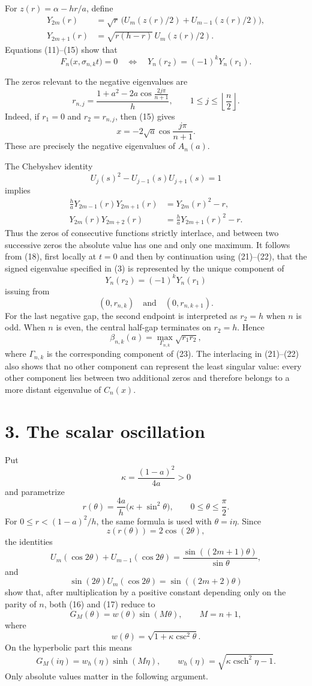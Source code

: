 \documentclass[11pt]{article}
\begin{document}
For \(z(r)=\alpha-hr/a\), define
\begin{align}
Y_{2m}(r)
 &=\sqrt r\,
   \bigl(U_m(z(r)/2)+U_{m-1}(z(r)/2)\bigr),
\tag{16}\\
Y_{2m+1}(r)
 &=\sqrt{r(h-r)}\,U_m(z(r)/2).
\tag{17}
\end{align}
Equations (11)--(15) show that
\[
F_n\bigl(x,\sigma_{n,k}t\bigr)=0
\quad\Longleftrightarrow\quad
Y_n(r_2)=(-1)^kY_n(r_1).
\tag{18}
\]

The zeros relevant to the negative eigenvalues are
\[
r_{n,j}
 =\frac{1+a^2-2a\cos\frac{2j\pi}{n+1}}h,
\qquad
1\leq j\leq \left\lfloor\frac n2\right\rfloor.
\tag{19}
\]
Indeed, if \(r_1=0\) and \(r_2=r_{n,j}\), then (15) gives
\[
x=-2\sqrt a\cos\frac{j\pi}{n+1}.
\]
These are precisely the negative eigenvalues of \(A_n(a)\).

The Chebyshev identity
\[
U_j(s)^2-U_{j-1}(s)U_{j+1}(s)=1
\tag{20}
\]
implies
\begin{align}
\frac haY_{2m-1}(r)Y_{2m+1}(r)&=Y_{2m}(r)^2-r,
\tag{21}\\
Y_{2m}(r)Y_{2m+2}(r)&=\frac haY_{2m+1}(r)^2-r.
\tag{22}
\end{align}
Thus the zeros of consecutive functions strictly interlace, and between two
successive zeros the absolute value has one and only one maximum. It follows
from (18), first locally at \(t=0\) and then by continuation using
(21)--(22), that the signed eigenvalue specified in (3) is represented by the
unique component of
\[
Y_n(r_2)=(-1)^kY_n(r_1)
\tag{23}
\]
issuing from
\[
(0,r_{n,k})
\quad\text{and}\quad
(0,r_{n,k+1}).
\]
For the last negative gap, the second endpoint is interpreted as \(r_2=h\)
when \(n\) is odd. When \(n\) is even, the central half-gap terminates on
\(r_2=h\). Hence
\[
\beta_{n,k}(a)
 =\max_{\Gamma_{n,k}}\sqrt{r_1r_2},
\tag{24}
\]
where \(\Gamma_{n,k}\) is the corresponding component of (23). The
interlacing in (21)--(22) also shows that no other component can represent the
least singular value: every other component lies between two additional
zeros and therefore belongs to a more distant eigenvalue of \(C_n(x)\).

\section*{3. The scalar oscillation}

Put
\[
\kappa=\frac{(1-a)^2}{4a}>0
\]
and parametrize
\[
r(\theta)=\frac{4a}{h}\bigl(\kappa+\sin^2\theta\bigr),
\qquad 0\leq\theta\leq\frac{\pi}{2}.
\tag{25}
\]
For \(0\leq r<(1-a)^2/h\), the same formula is used with
\(\theta=i\eta\). Since
\[
z(r(\theta))=2\cos(2\theta),
\]
the identities
\[
U_m(\cos2\theta)+U_{m-1}(\cos2\theta)
 =\frac{\sin((2m+1)\theta)}{\sin\theta},
\]
and
\[
\sin(2\theta)U_m(\cos2\theta)=\sin((2m+2)\theta)
\]
show that, after multiplication by a positive constant depending only on the
parity of \(n\), both (16) and (17) reduce to
\[
G_M(\theta)=w(\theta)\sin(M\theta),
\qquad
M=n+1,
\tag{26}
\]
where
\[
w(\theta)=\sqrt{1+\kappa\csc^2\theta}.
\tag{27}
\]
On the hyperbolic part this means
\[
G_M(i\eta)
 =w_h(\eta)\sinh(M\eta),
\qquad
w_h(\eta)=\sqrt{\kappa\operatorname{csch}^2\eta-1}.
\tag{28}
\]
Only absolute values matter in the following argument.
\end{document}
